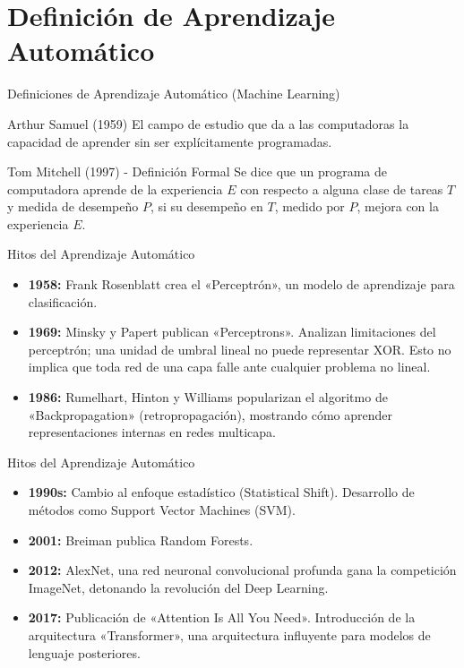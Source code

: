 \documentclass[aspectratio=169]{beamer}
\begin{document}
\section{Definición de Aprendizaje Automático}

\begin{frame}[t]{Definiciones de Aprendizaje Automático (Machine Learning)}

    \begin{block}{Arthur Samuel (1959)}
        El campo de estudio que da a las computadoras la capacidad de aprender sin ser explícitamente programadas.
    \end{block}

    \begin{block}{Tom Mitchell (1997) - Definición Formal}
        Se dice que un programa de computadora aprende de la {experiencia $E$} con respecto a alguna clase de {tareas $T$} y medida de {desempeño $P$}, si su desempeño en $T$, medido por $P$, {mejora con la experiencia $E$}.
    \end{block}
\end{frame}

\begin{frame}[t]{Hitos del Aprendizaje Automático}
    \begin{itemize}
        \item \textbf{1958:} Frank Rosenblatt crea el «{Perceptrón}», un modelo de aprendizaje para clasificación.
        \item \textbf{1969:} Minsky y Papert publican «{Perceptrons}». Analizan limitaciones del perceptrón; una unidad de umbral lineal no puede representar XOR. Esto no implica que toda red de una capa falle ante cualquier problema no lineal.
        \item \textbf{1986:} Rumelhart, Hinton y Williams popularizan el algoritmo de «{Backpropagation}» (retropropagación), mostrando cómo aprender representaciones internas en redes multicapa.
    \end{itemize}
\end{frame}
\begin{frame}[t]{Hitos del Aprendizaje Automático}
    \begin{itemize}
        \item \textbf{1990s:} Cambio al enfoque {estadístico} (Statistical Shift). Desarrollo de métodos como {Support Vector Machines} (SVM).
        \item \textbf{2001:} Breiman publica {Random Forests}.
        \item \textbf{2012:} {AlexNet}, una red neuronal convolucional profunda gana la competición ImageNet, detonando la revolución del {Deep Learning}.
        \item \textbf{2017:} Publicación de «{Attention Is All You Need}». Introducción de la arquitectura «{Transformer}», una arquitectura influyente para modelos de lenguaje posteriores.
    \end{itemize}
\end{frame}
\end{document}
